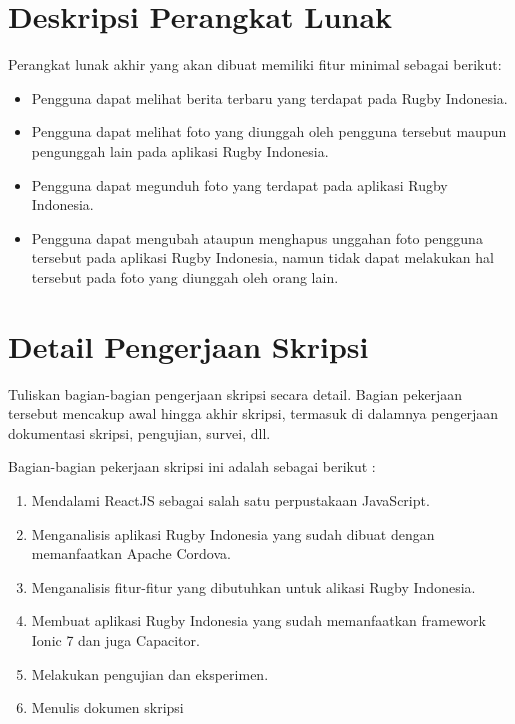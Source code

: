 \documentclass[a4paper,twoside]{article}
\begin{document}
\section{Deskripsi Perangkat Lunak}

Perangkat lunak akhir yang akan dibuat memiliki fitur minimal sebagai berikut:
\begin{itemize}
    \item Pengguna dapat melihat berita terbaru yang terdapat pada Rugby Indonesia.
    \item Pengguna dapat melihat foto yang diunggah oleh pengguna tersebut maupun pengunggah lain pada aplikasi Rugby Indonesia.
    \item Pengguna dapat megunduh foto yang terdapat pada aplikasi Rugby Indonesia.
    \item Pengguna dapat mengubah ataupun menghapus unggahan foto pengguna tersebut pada aplikasi Rugby Indonesia, namun tidak dapat melakukan hal tersebut pada foto yang diunggah oleh orang lain.
\end{itemize}

\section{Detail Pengerjaan Skripsi}
Tuliskan bagian-bagian pengerjaan skripsi secara detail. Bagian pekerjaan tersebut mencakup awal hingga akhir skripsi, termasuk di dalamnya pengerjaan dokumentasi skripsi, pengujian, survei, dll.

Bagian-bagian pekerjaan skripsi ini adalah sebagai berikut :
\begin{enumerate}
    \item Mendalami ReactJS sebagai salah satu perpustakaan JavaScript.
    \item Menganalisis aplikasi Rugby Indonesia yang sudah dibuat dengan memanfaatkan Apache Cordova.
    \item Menganalisis fitur-fitur yang dibutuhkan untuk alikasi Rugby Indonesia.
    \item Membuat aplikasi Rugby Indonesia yang sudah memanfaatkan framework Ionic 7 dan juga Capacitor.
    \item Melakukan pengujian dan eksperimen.
    \item Menulis dokumen skripsi
\end{enumerate}
\end{document}

